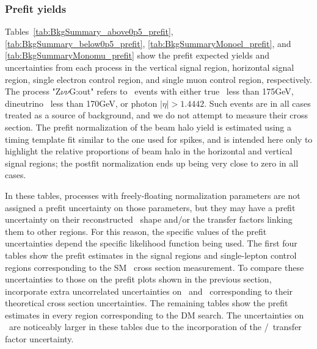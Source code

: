 \subsubsection{Prefit yields}
Tables~\ref{tab:BkgSummary_above0p5_prefit}, \ref{tab:BkgSummary_below0p5_prefit}, \ref{tab:BkgSummaryMonoel_prefit},
and \ref{tab:BkgSummaryMonomu_prefit} show the prefit expected yields and uncertainties from each process in the vertical signal region,
horizontal signal region, single electron control region, and single muon control region, respectively. The process "Z$\nu\nu$G:out" refers
to \zinvg\ events with either true \pTgamma\ less than 175\unit{GeV}, dineutrino \pT\ less than 170\unit{GeV}, or photon $|\eta| > 1.4442$. Such events are
in all cases treated as a source of background, and we do not attempt to measure their cross section. The prefit normalization of the beam halo yield is
estimated using a timing template fit similar to the one used for spikes, and is
intended here only to highlight the relative proportions of beam halo in the horizontal and vertical signal regions; the postfit normalization
ends up being very close to zero in all cases.

In these tables, processes with freely-floating normalization parameters
are not assigned a prefit uncertainty on those parameters, but they may have a prefit uncertainty on their reconstructed \ETgamma\ shape
and/or the transfer factors linking them to other regions. For this reason, the specific values of the prefit uncertainties
depend the specific likelihood function being used. The first four tables show the prefit estimates in the signal regions and single-lepton control regions
corresponding to the SM \zinvg\ cross section measurement.
To compare these uncertainties to those on the prefit plots shown in the previous section,
incorporate extra uncorrelated uncertainties on \zinvg\ and \wlng\ corresponding to their theoretical cross section uncertainties.
The remaining tables show the prefit estimates in every region corresponding to the DM search. The uncertainties on \wlng\ are noticeably larger in these
tables due to the incorporation of the \zinvg/\wlng\ transfer factor uncertainty.

